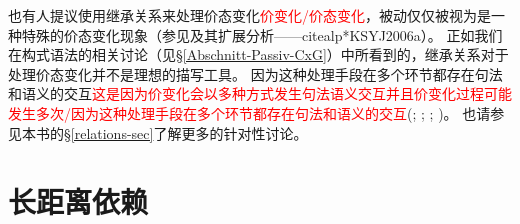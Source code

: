 也有人提议使用继承关系来处理价态变化\textcolor{red}{价变化/价态变化}，被动仅仅被视为是一种特殊的价态变化现象（参见\citealp{Candito96a}及其扩展分析——citealp*{KSYJ2006a}）。
正如我们在构式语法的相关讨论（见\S \ref{Abschnitt-Passiv-CxG}）中所看到的，继承关系对于处理价态变化并不是理想的描写工具。
因为这种处理手段在多个环节都存在句法和语义的交互\textcolor{red}{这是因为价变化会以多种方式发生句法语义交互并且价变化过程可能发生多次/因为这种处理手段在多个环节都存在句法和语义的交互}(\citealp{Mueller2006d,Mueller2007d}; \citeyear[Section~7.5.2]{MuellerLehrbuch1};
\citeyear{MuellerUnifying}; \citeyear{MWArgSt})。
也请参见本书的\S \ref{relations-sec}了解更多的针对性讨论。 

\section{长距离依赖}
\label{TAG-Fernabh}

